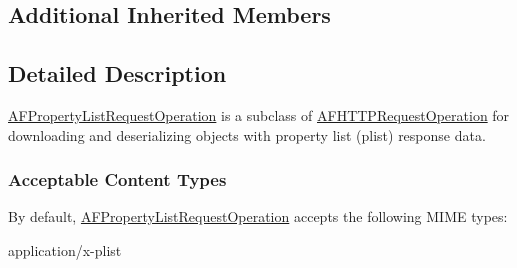 \subsection*{Additional Inherited Members}


\subsection{Detailed Description}
{\ttfamily \hyperlink{interface_a_f_property_list_request_operation}{A\-F\-Property\-List\-Request\-Operation}} is a subclass of {\ttfamily \hyperlink{interface_a_f_h_t_t_p_request_operation}{A\-F\-H\-T\-T\-P\-Request\-Operation}} for downloading and deserializing objects with property list (plist) response data.

\subsubsection*{Acceptable Content Types}

By default, {\ttfamily \hyperlink{interface_a_f_property_list_request_operation}{A\-F\-Property\-List\-Request\-Operation}} accepts the following M\-I\-M\-E types\-:


\begin{DoxyItemize}
\item {\ttfamily application/x-\/plist} 
\end{DoxyItemize}

